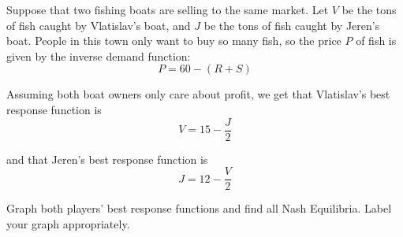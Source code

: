 \documentclass{article}
\begin{document}
\begin{question}
Suppose that two fishing boats are selling to the same market.
Let $V$ be the tons of fish caught by Vlatislav's boat,
and $J$ be the tons of fish caught by Jeren's boat.
People in this town only want to buy so many fish,
so the price $P$ of fish is given by the inverse demand function:
  $$P = 60 - (R+S)$$

Assuming both boat owners only care about profit, 
we get that Vlatislav's best response function is
  $$ V = 15 - \frac{J}{2} $$

and that Jeren's best response function is
$$ J = 12 - \frac{V}{2}$$ 

Graph both players' best response functions 
and find all Nash Equilibria.
Label your graph appropriately.

\vspace{10mm}


\end{question}
\end{document}
